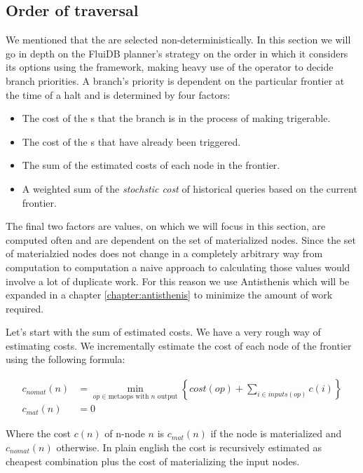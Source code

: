 \subsection{Order of traversal}

We mentioned that the  are selected
non-deterministically. In this section we will go in depth on the
FluiDB planner's strategy on the order in which it considers its
options using the  framework, making heavy use of the
 operator to decide branch priorities. A branch's priority
is dependent on the particular frontier at the time of a halt and is
determined by four factors:

\begin{itemize}
\item The cost of the s that the branch is in the process
  of making trigerable.
\item The cost of the s that have already been triggered.
\item The sum of the estimated costs of each node in the frontier.
\item A weighted sum of the \emph{stochstic cost} of historical queries based
on the current frontier.
\end{itemize}

The final two factors are values, on which we will focus in this
section, are computed often and are dependent on the set of
materialized nodes. Since the set of materialzied nodes does not
change in a completely arbitrary way from computation to computation a
naive approach to calculating those values would involve a lot of
duplicate work. For this reason we use Antisthenis which will be
expanded in a chapter \ref{chapter:antisthenis} to minimize the amount
of work required.

Let's start with the sum of estimated costs. We have a very rough way
of estimating costs. We incrementally estimate the cost of each node
of the frontier using the following formula:

\begin{align}
  c_{nomat}(n) &=
    \min\limits_{op \in \text{metaops with \(n\) output}} \left\{ cost(op) + \sum\limits_{i \in inputs(op)} c(i)  \right\} \\
  c_{mat}(n) &= 0
\end{align}

Where the cost \(c(n)\) of n-node \(n\) is \(c_{mat}(n)\) if the node
is materialized and \(c_{nomat}(n)\) otherwise. In plain english the
cost is recursively estimated as cheapest combination 
plus the cost of materializing the input nodes.

